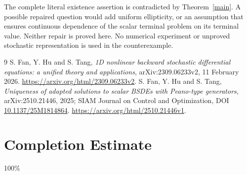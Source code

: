 \documentclass[11pt]{article}
\begin{document}
The complete literal existence assertion is contradicted by
Theorem~\ref{main}. A possible repaired question would add uniform
ellipticity, or an assumption that ensures continuous dependence of the
scalar terminal problem on its terminal value. Neither repair is proved
here. No numerical experiment or unproved stochastic representation is
used in the counterexample.

\begin{thebibliography}{9}
 S. Fan, Y. Hu and S. Tang,
\emph{1D nonlinear backward stochastic differential equations: a unified theory and applications}, arXiv:2309.06233v2, 11 February 2026.
\url{https://arxiv.org/html/2309.06233v2}.
 S. Fan, Y. Hu and S. Tang,
\emph{Uniqueness of adapted solutions to scalar BSDEs with Peano-type generators},
arXiv:2510.21446, 2025; SIAM Journal on Control and Optimization,
DOI \href{https://doi.org/10.1137/25M1814864}{10.1137/25M1814864}.
\url{https://arxiv.org/html/2510.21446v1}.
\end{thebibliography}
\section{Completion Estimate}
100\%
\end{document}
